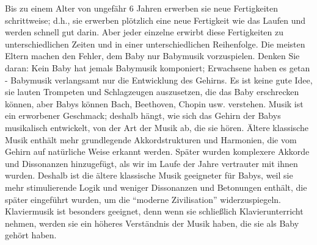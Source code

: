 Bis zu einem Alter von ungefähr 6 Jahren erwerben sie neue Fertigkeiten schrittweise; d.h., sie erwerben plötzlich eine neue Fertigkeit wie das Laufen und werden schnell gut darin.
Aber jeder einzelne erwirbt diese Fertigkeiten zu unterschiedlichen Zeiten und in einer unterschiedlichen Reihenfolge.
Die meisten Eltern machen den Fehler, dem Baby nur Babymusik vorzuspielen.
Denken Sie daran: Kein Baby hat jemals Babymusik komponiert; Erwachsene haben es getan - Babymusik verlangsamt nur die Entwicklung des Gehirns.
Es ist keine gute Idee, sie lauten Trompeten und Schlagzeugen auszusetzen, die das Baby erschrecken können, aber Babys können Bach, Beethoven, Chopin usw. verstehen.
Musik ist ein erworbener Geschmack; deshalb hängt, wie sich das Gehirn der Babys musikalisch entwickelt, von der Art der Musik ab, die sie hören.
Ältere klassische Musik enthält mehr grundlegende Akkordstrukturen und Harmonien, die vom Gehirn auf natürliche Weise erkannt werden.
Später wurden komplexere Akkorde und Dissonanzen hinzugefügt, als wir im Laufe der Jahre vertrauter mit ihnen wurden.
Deshalb ist die ältere klassische Musik geeigneter für Babys, weil sie mehr stimulierende Logik und weniger Dissonanzen und Betonungen enthält, die später eingeführt wurden, um die \enquote{moderne Zivilisation} widerzuspiegeln.
Klaviermusik ist besonders geeignet, denn wenn sie schließlich Klavierunterricht nehmen, werden sie ein höheres Verständnis der Musik haben, die sie als Baby gehört haben.


\hypertarget{c1iii18c3}{}

